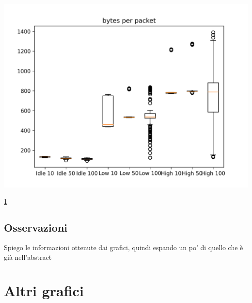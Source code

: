 \documentclass[12pt, a4paper]{article}
\begin{document}
\includegraphics{graphs/bytes per packet.png}\label{graphs:bp}

\ref{appendix:grafici}

\subsection{Osservazioni}

Spiego le informazioni ottenute dai grafici, quindi espando un po' di quello che è già nell'abstract \\




\appendix

\section{Altri grafici}\label{appendix:grafici}
\end{document}
